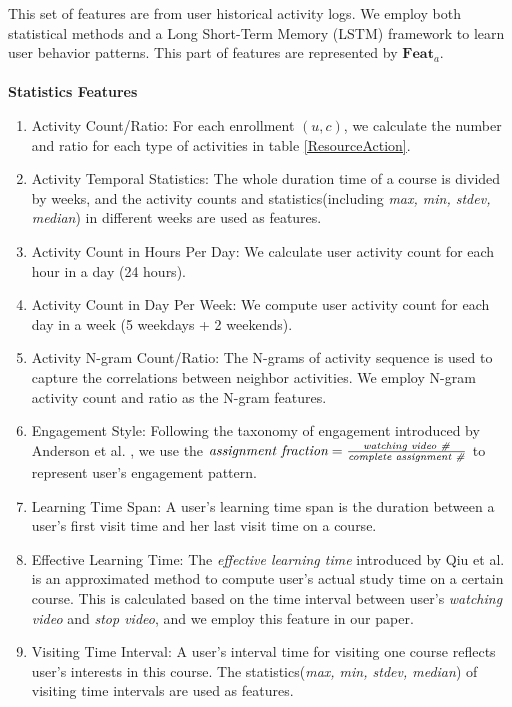	\label{sec:activityFeat}
This set of features are from user historical activity logs. We employ both statistical methods and a Long Short-Term Memory (LSTM) framework to learn user behavior patterns. This part of features are represented by $\mathbf{Feat}_{a}$. \\\\
\noindent \textbf{Statistics Features}
\begin{enumerate}
	\item{Activity Count/Ratio:} For each enrollment $(u,c)$, we calculate the number and ratio for each type of activities in table \ref{ResourceAction}. 
	\item{Activity Temporal Statistics:} The whole duration time of a course is divided by weeks, and the activity counts and statistics(including \emph{max, min, stdev, median}) in different weeks are used as features.
	\item{Activity Count in Hours Per Day:} We calculate user activity count for each hour in a day (24 hours).
	\item{Activity Count in Day Per Week:} We compute user activity count for each day in a week (5 weekdays + 2 weekends).
	\item{Activity N-gram Count/Ratio:} The N-grams of activity sequence is used to capture the correlations between neighbor activities. We employ N-gram activity count and ratio as the N-gram features.
	\item{Engagement Style:} Following the taxonomy of engagement introduced by Anderson et al. \cite{Anderson:2014:EMO:2566486.2568042ß}, we use the $\emph{assignment fraction} = \frac{ \emph{watching video \#}}{ \emph{complete assignment \#}}$ to represent user's engagement pattern.
	\item{Learning Time Span:} A user's learning time span is the duration between a user's first visit time and her last visit time on a course.  
	
	\item{Effective Learning Time:} The \emph{effective learning time} introduced by Qiu et al. \cite{Qiu:2016:MPL:2835776.2835842} is an approximated method to compute user's actual study time on a certain course. This is calculated based on the time interval between user's \emph{watching video} and \emph{stop video}, and we employ this feature in our paper.
	
	\item{Visiting Time Interval:} A user's interval time for visiting one course reflects user's interests in this course. The statistics(\emph{max, min, stdev, median}) of visiting time intervals are used as features.\\
\end{enumerate}


